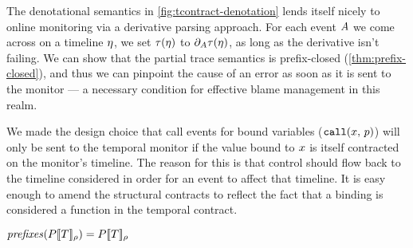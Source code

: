 The denotational semantics in \autoref{fig:tcontract-denotation} lends itself nicely to online monitoring via a derivative parsing approach.
%
For each event $A$ we come across on a timeline $\eta$, we set $\tau(\eta)$ to $\partial_{A}{\tau(\eta)}$, as long as the derivative isn't failing.
%
We can show that the partial trace semantics is prefix-closed (\autoref{thm:prefix-closed}), and thus we can pinpoint the cause of an error as soon as it is sent to the monitor --- a necessary condition for effective blame management in this realm.

We made the design choice that call events for bound variables (${\tt call}(x,\, p)$) will only be sent to the temporal monitor if the value bound to $x$ is itself contracted on the monitor's timeline.
%
The reason for this is that control should flow back to the timeline considered in order for an event to affect that timeline.
%
It is easy enough to amend the structural contracts to reflect the fact that a binding is considered a function in the temporal contract.

\begin{theorem}\label{thm:prefix-closed}
  $\mathit{prefixes}(P[\![ T ]\!]_{\rho}) = P[\![ T ]\!]_{\rho}$
\end{theorem}

